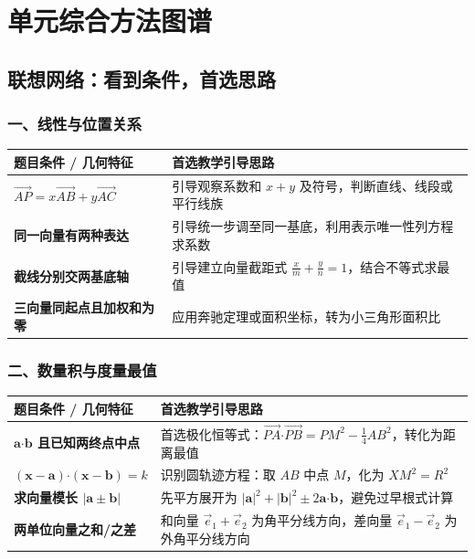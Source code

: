 \documentclass[11pt,a4paper,openany]{ctexbook}
\newcommand{\vect}[1]{\overrightarrow{#1}}
\newcommand{\vv}[1]{\bm{#1}}
\newcommand{\dotp}{\mathbin{\boldsymbol\cdot}}
\begin{document}
\chapter{单元综合方法图谱}

\section{联想网络：看到条件，首选思路}

\subsection{一、线性与位置关系}
\begin{center}
\begin{tabularx}{0.98\textwidth}{>{\bfseries}p{4.2cm}X}
\toprule
题目条件 / 几何特征 & 首选教学引导思路\\
\midrule
\(\vect{AP}=x\vect{AB}+y\vect{AC}\) & 引导观察系数和 \(x+y\) 及符号，判断直线、线段或平行线族\\
同一向量有两种表达 & 引导统一步调至同一基底，利用表示唯一性列方程求系数\\
截线分别交两基底轴 & 引导建立向量截距式 \(\frac xm+\frac yn=1\)，结合不等式求最值\\
三向量同起点且加权和为零 & 应用奔驰定理或面积坐标，转为小三角形面积比\\
\bottomrule
\end{tabularx}
\end{center}

\subsection{二、数量积与度量最值}
\begin{center}
\begin{tabularx}{0.98\textwidth}{>{\bfseries}p{4.2cm}X}
\toprule
题目条件 / 几何特征 & 首选教学引导思路\\
\midrule
\(\vv a\dotp\vv b\) 且已知两终点中点 & 首选极化恒等式：\(\vect{PA}\dotp\vect{PB}=PM^2-\frac14AB^2\)，转化为距离最值\\
\((\vv x-\vv a)\dotp(\vv x-\vv b)=k\) & 识别圆轨迹方程：取 \(AB\) 中点 \(M\)，化为 \(XM^2 = R^2\)\\
求向量模长 \(|\vv a\pm\vv b|\) & 先平方展开为 \(|\vv a|^2+|\vv b|^2\pm 2\vv a\dotp\vv b\)，避免过早根式计算\\
两单位向量之和/之差 & 和向量 \(\vec e_1+\vec e_2\) 为角平分线方向，差向量 \(\vec e_1-\vec e_2\) 为外角平分线方向\\
\bottomrule
\end{tabularx}
\end{center}
\end{document}
